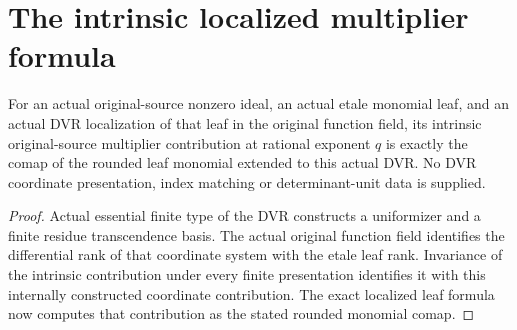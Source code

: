 \section{The intrinsic localized multiplier formula}

\begin{theorem}\label{thm:sc0-intrinsic-localized-multiplier-formula}
\leanok
{}
For an actual original-source nonzero ideal, an actual etale monomial
leaf, and an actual DVR localization of that leaf in the original
function field, its intrinsic original-source multiplier contribution
at rational exponent $q$ is exactly the comap of the rounded leaf
monomial extended to this actual DVR. No DVR coordinate presentation,
index matching or determinant-unit data is supplied.
\end{theorem}
\begin{proof}
Actual essential finite type of the DVR constructs a uniformizer and a
finite residue transcendence basis. The actual original function field
identifies the differential rank of that coordinate system with the
etale leaf rank. Invariance of the intrinsic contribution under every
finite presentation identifies it with this internally constructed
coordinate contribution. The exact localized leaf formula now computes
that contribution as the stated rounded monomial comap.
\end{proof}
